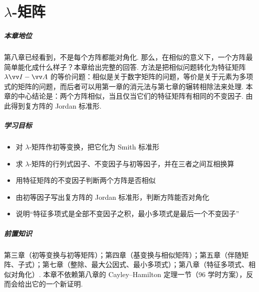 	\chapter{\texorpdfstring{$\lambda$}{λ}-矩阵}\label{ch:lambda}
	
	\paragraph*{本章地位}
	
	第八章已经看到，不是每个方阵都能对角化. 那么，在相似的意义下，一个方阵最简单能化成什么样子？本章给出完整的回答. 方法是把相似问题转化为特征矩阵 $\lambda\vv I-\vv A$ 的等价问题：相似是关于数字矩阵的问题，等价是关于元素为多项式的矩阵的问题，而后者可以用第一章的消元法与第七章的辗转相除法来处理. 本章的中心结论是：两个方阵相似，当且仅当它们的特征矩阵有相同的不变因子. 由此得到复方阵的 Jordan 标准形.
	
	
	\paragraph*{学习目标}
	\begin{itemize}
		\item 对 $\lambda$-矩阵作初等变换，把它化为 Smith 标准形
		\item 求 $\lambda$-矩阵的行列式因子、不变因子与初等因子，并在三者之间互相换算
		\item 用特征矩阵的不变因子判断两个方阵是否相似
		\item 由初等因子写出复方阵的 Jordan 标准形，判断方阵能否对角化
		\item 说明“特征多项式是全部不变因子之积，最小多项式是最后一个不变因子”
	\end{itemize}
	
	\paragraph*{前置知识}
	
	第三章（初等变换与初等矩阵）；第四章（基变换与相似矩阵）；第五章（伴随矩阵、子式）；第七章（整除、最大公因式、最小多项式）；第八章（特征多项式、相似对角化）. 本章不依赖第八章的 Cayley–Hamilton 定理一节（96 学时方案），反而会给出它的一个新证明.
	
